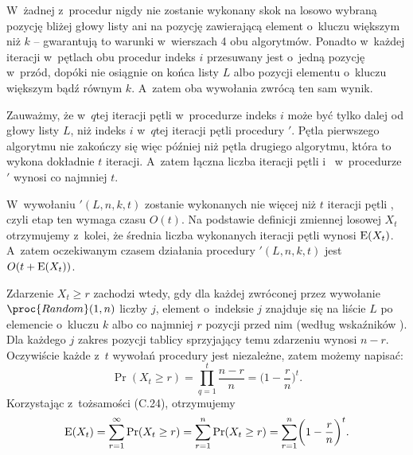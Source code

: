 \bignegskip

\subproblem %
W~żadnej z~procedur nigdy nie zostanie wykonany skok na losowo wybraną pozycję bliżej głowy listy ani na pozycję zawierającą element o~kluczu większym niż $k$ -- gwarantują to warunki w~wierszach 4 obu algorytmów.
Ponadto w~każdej iteracji w~pętlach  obu procedur indeks $i$ przesuwany jest o~jedną pozycję w~przód, dopóki nie osiągnie on końca listy $L$ albo pozycji elementu o~kluczu większym bądź równym $k$.
A~zatem oba wywołania zwrócą ten sam wynik.

Zauważmy, że w~$q$\nbhyphen tej iteracji pętli  w~procedurze  indeks $i$ może być tylko dalej od głowy listy $L$, niż indeks $i$ w~$q$\nbhyphen tej iteracji pętli  procedury $'$.
Pętla pierwszego algorytmu nie zakończy się więc później niż pętla drugiego algorytmu, która to wykona dokładnie $t$ iteracji.
A~zatem łączna liczba iteracji pętli  i~ w~procedurze $'$ wynosi co najmniej $t$.

\subproblem %
W~wywołaniu $'(L,n,k,t)$ zostanie wykonanych nie więcej niż $t$ iteracji pętli , czyli etap ten wymaga czasu $O(t)$.
Na podstawie definicji zmiennej losowej $X_t$ otrzymujemy z~kolei, że średnia liczba wykonanych iteracji pętli  wynosi $\operatorname{E}(X_t)$.
A~zatem oczekiwanym czasem działania procedury $'(L,n,k,t)$ jest $O(t+\operatorname{E}(X_t))$.

\subproblem %
Zdarzenie $X_t\ge r$ zachodzi wtedy, gdy dla każdej zwróconej przez wywołanie $\proc{Random}(1,n)$ liczby $j$, element o~indeksie $j$ znajduje się na liście $L$ po elemencie o~kluczu $k$ albo co najmniej $r$ pozycji przed nim (według wskaźników ).
Dla każdego $j$ zakres pozycji tablicy sprzyjający temu zdarzeniu wynosi $n-r$.
Oczywiście każde z~$t$ wywołań procedury  jest niezależne, zatem możemy napisać:
\[
	\Pr(X_t \ge r) = \prod_{q=1}^t\frac{n-r}{n} = \biggl(1-\frac{r}{n}\biggr)^t.
\]
Korzystając z~tożsamości (C.24), otrzymujemy
\[
	\operatorname{E}(X_t) = \sum_{r=1}^\infty\Pr(X_t\ge r) = \sum_{r=1}^n\Pr(X_t\ge r) = \sum_{r=1}^n\biggl(1-\frac{r}{n}\biggr)^t.
\]

